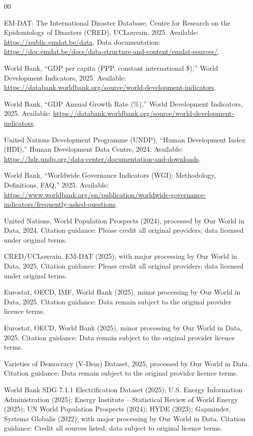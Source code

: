 \documentclass[conference]{IEEEtran}
\begin{document}
\begin{thebibliography}{00}

EM-DAT: The International Disaster Database, Centre for Research on the Epidemiology of Disasters (CRED), UCLouvain, 2025. 
Available: \url{https://public.emdat.be/data}. 
Data documentation: \url{https://doc.emdat.be/docs/data-structure-and-content/emdat-sources/}.

World Bank, “GDP per capita (PPP, constant international \$),” World Development Indicators, 2025. 
Available: \url{https://databank.worldbank.org/source/world-development-indicators}.

World Bank, “GDP Annual Growth Rate (\%),” World Development Indicators, 2025. 
Available: \url{https://databank.worldbank.org/source/world-development-indicators}.

United Nations Development Programme (UNDP), “Human Development Index (HDI),” Human Development Data Centre, 2024. 
Available: \url{https://hdr.undp.org/data-center/documentation-and-downloads}.

World Bank, “Worldwide Governance Indicators (WGI): Methodology, Definitions, FAQ,” 2025. 
Available: \url{https://www.worldbank.org/en/publication/worldwide-governance-indicators/frequently-asked-questions}.

United Nations, World Population Prospects (2024), processed by Our World in Data, 2024. 
Citation guidance: Please credit all original providers; data licensed under original terms.

CRED/UCLouvain, EM-DAT (2025), with major processing by Our World in Data, 2025. 
Citation guidance: Please credit all original providers; data licensed under original terms.

Eurostat, OECD, IMF, World Bank (2025), minor processing by Our World in Data, 2025. 
Citation guidance: Data remain subject to the original provider licence terms.

Eurostat, OECD, World Bank (2025), minor processing by Our World in Data, 2025. 
Citation guidance: Data remain subject to the original provider licence terms.

Varieties of Democracy (V-Dem) Dataset, 2025, processed by Our World in Data. 
Citation guidance: Data remain subject to the original provider licence terms.

World Bank SDG 7.1.1 Electrification Dataset (2025); U.S. Energy Information Administration (2025); Energy Institute – Statistical Review of World Energy (2025); UN World Population Prospects (2024); HYDE (2023); Gapminder, Systema Globalis (2022); with major processing by Our World in Data.
Citation guidance: Credit all sources listed; data subject to original licence terms.


\end{thebibliography}
\end{document}
